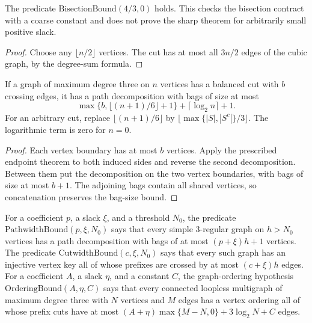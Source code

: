 \begin{theorem}
  \label{thm:lowerbounds-algebraic-bisection-coarse}
  \leanok
  The predicate $\mathrm{BisectionBound}(4/3,0)$ holds. This checks the
  bisection contract with a coarse constant and does not prove the sharp
  theorem for arbitrarily small positive slack.
\end{theorem}
\begin{proof}
  \leanok
  Choose any $\lfloor n/2\rfloor$ vertices. The cut has at most all
  $3n/2$ edges of the cubic graph, by the degree-sum formula.
\end{proof}

\begin{theorem}
  \label{thm:lowerbounds-algebraic-bisection-assembly}
  \leanok
  If a graph of maximum degree three on $n$ vertices has a balanced cut
  with $b$ crossing edges, it has a path decomposition with bags of size
  at most
  \[
    \max\{b,\lfloor(n+1)/6\rfloor+1\}+\lceil\log_2 n\rceil+1.
  \]
  For an arbitrary cut, replace $\lfloor(n+1)/6\rfloor$ by
  $\lfloor\max\{|S|,|S^c|\}/3\rfloor$. The logarithmic term is zero
  for $n=0$.
\end{theorem}
\begin{proof}
  \leanok
  Each vertex boundary has at most $b$ vertices. Apply the prescribed
  endpoint theorem to both induced sides and reverse the second
  decomposition. Between them put the decomposition on the two vertex
  boundaries, with bags of size at most $b+1$. The adjoining bags contain
  all shared vertices, so concatenation preserves the bag-size bound.
\end{proof}

\begin{definition}
  \label{def:lowerbounds-algebraic-ordering-hypotheses}
  \leanok
  For a coefficient $p$, a slack $\xi$, and a threshold $N_0$, the predicate
  $\mathrm{PathwidthBound}(p,\xi,N_0)$ says that every simple $3$-regular
  graph on $h>N_0$ vertices has a path decomposition with bags of at most
  $(p+\xi)h+1$ vertices. The predicate $\mathrm{CutwidthBound}(c,\xi,N_0)$
  says that every such graph has an injective vertex key all of whose
  prefixes are crossed by at most $(c+\xi)h$ edges. For a coefficient $A$,
  a slack $\eta$, and a constant $C$, the graph-ordering hypothesis
  $\mathrm{OrderingBound}(A,\eta,C)$ says that every connected loopless
  multigraph of maximum degree three with $N$ vertices and $M$ edges has a
  vertex ordering all of whose prefix cuts have at most
  $(A+\eta)\max\{M-N,0\}+3\log_2 N+C$ edges.
\end{definition}

